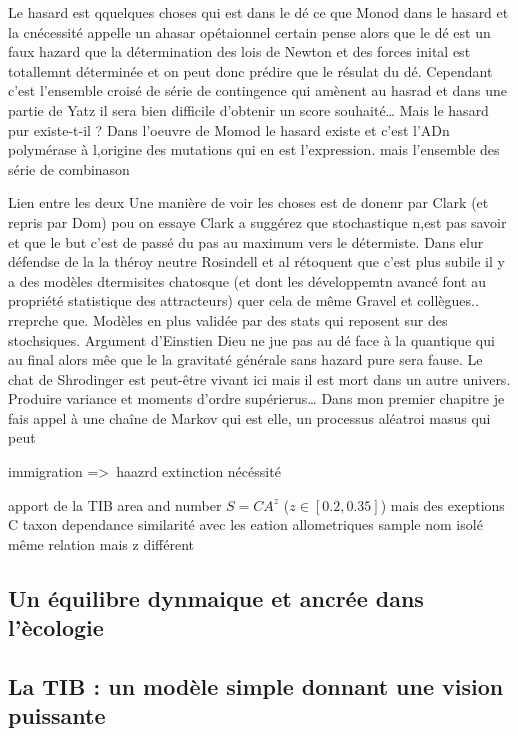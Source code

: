 Le hasard est qquelques choses qui est dans le dé ce que Monod dans le
hasard et la cnécessité appelle un ahasar opétaionnel certain pense
alors que le dé est un faux hazard que la détermination des lois de
Newton et des forces inital est totallemnt déterminée et on peut donc
prédire que le résulat du dé. Cependant c'est l'ensemble croisé de série
de contingence qui amènent au hasrad et dans une partie de Yatz il sera
bien difficile d'obtenir un score souhaité\ldots{} Mais le hasard pur
existe-t-il ? Dans l'oeuvre de Momod le hasard existe et c'est l'ADn
polymérase à l,origine des mutations qui en est l'expression. mais
l'ensemble des série de combinason

Lien entre les deux Une manière de voir les choses est de donenr par
Clark (et repris par Dom) pou on essaye Clark a suggérez que
stochastique n,est pas savoir et que le but c'est de passé du pas au
maximum vers le détermiste. Dans elur défendse de la la théroy neutre
Rosindell et al rétoquent que c'est plus subile il y a des modèles
dtermisites chatosque (et dont les développemtn avancé font au propriété
statistique des attracteurs) quer cela de même Gravel et collègues..
rreprche que. Modèles en plus validée par des stats qui reposent sur des
stochsiques. Argument d'Einstien Dieu ne jue pas au dé face à la
quantique qui au final alors mêe que le la gravitaté générale sans
hazard pure sera fause. Le chat de Shrodinger est peut-être vivant ici
mais il est mort dans un autre univers. Produire variance et moments
d'ordre supérierus\ldots{} Dans mon premier chapitre je fais appel à une
chaîne de Markov qui est elle, un processus aléatroi masus qui peut

immigration =\textgreater{}~haazrd extinction nécéssité

apport de la TIB area and number \(S=CA^z\) (\(z \in [0.2,0.35]\)) mais
des exeptions C taxon dependance similarité avec les eation
allometriques sample nom isolé même relation mais z différent

\subsection*{Un équilibre dynmaique et ancrée dans
l'ècologie}\label{un-uxe9quilibre-dynmaique-et-ancruxe9e-dans-luxe8cologie}

\subsection{La TIB : un modèle simple donnant une vision
puissante}\label{la-tib-un-moduxe8le-simple-donnant-une-vision-puissante}

